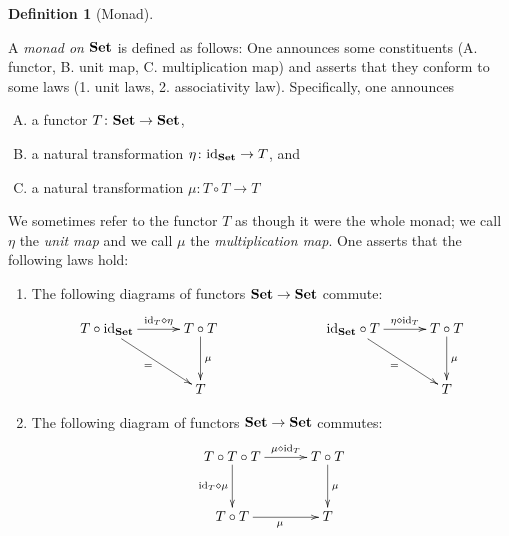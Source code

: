\documentclass{book}
\def\tn{\textnormal}
\def\to{\rightarrow}
\def\taking{\colon}
\def\id{\tn{id}}
\def\Set{{\bf Set}}
\theoremstyle{remark}
\theoremstyle{definition}
\newtheorem{definition}[subsubsection]{Definition}
\begin{document}
\begin{definition}[Monad]\label{def:monad}\index{monad!on $\Set$}

A {\em monad on $\Set$} is defined as follows: One announces some constituents (A. functor, B. unit map, C. multiplication map) and asserts that they conform to some laws (1. unit laws, 2. associativity law). Specifically, one announces
\begin{enumerate}[A.]
\item a functor $T\taking\Set\to\Set$,
\item a natural transformation $\eta\taking\id_{\Set}\to T$, and 
\item a natural transformation $\mu\taking T\circ T\to T$
\end{enumerate}
We sometimes refer to the functor $T$ as though it were the whole monad; we call $\eta$ the {\em unit map} and we call $\mu$ the {\em multiplication map}. One asserts that the following laws hold:
\begin{enumerate}[1.]
\item The following diagrams of functors $\Set\to\Set$ commute:
\begin{align*}
\xymatrix@=30pt{T\circ\id_\Set\ar[r]^-{\id_T\diamond\eta}\ar[dr]_{=}&T\circ T\ar[d]^\mu\\&T}\hspace{1in}
\xymatrix@=30pt{\id_\Set\circ T\ar[r]^-{\eta\diamond\id_T}\ar[dr]_=&T\circ T\ar[d]^\mu\\&T}
\end{align*}
\item The following diagram of functors $\Set\to\Set$ commutes:
\begin{align*}
\xymatrix@=30pt{T\circ T\circ T\ar[r]^-{\mu\diamond\id_T}\ar[d]_-{\id_T\diamond\mu}&T\circ T\ar[d]^\mu\\T\circ T\ar[r]_\mu&T}\end{align*}
\end{enumerate}

\end{definition}
\end{document}
